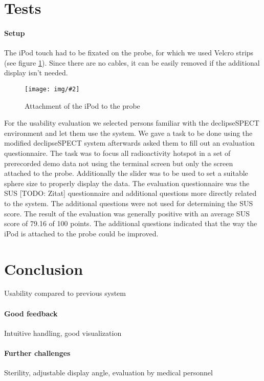 \documentclass{scrartcl}
\newcommand{\graphic}[3][width=\linewidth] %
{
  \begin{figure}[ht]
    \centering
    \texttt{[image: img/\#2]}
    \caption{#3}
    \label{fig:#2}
  \end{figure}
}
\newcommand{\refFigure}[1]{figure \ref{fig:#1}}
\begin{document}
\section{Tests}
\paragraph*{Setup}
The iPod touch had to be fixated on the probe, for which we used Velcro strips (see \refFigure{probe}). Since there are no cables, it can be easily removed if the additional display isn't needed.
\graphic[scale=.5]{probe}{Attachment of the iPod to the probe}

For the usability evaluation we selected persons familiar with the declipseSPECT environment and let them use the system. We gave a task to be done using the modified declipseSPECT system afterwards asked them to fill out an evaluation questionnaire.
The task was to focus all radioactivity hotspot in a set of prerecorded demo data not using the terminal screen but only the screen attached to the probe. Additionally the slider was to be used to set a suitable sphere size to properly display the data. The evaluation questionnaire was the SUS [TODO: Zitat] questionnaire and additional questions more directly related to the system. The additional questions were not used for determining the SUS score.
The result of the evaluation was generally positive with an average SUS score of 79.16 of 100 points. The additional questions indicated that the way the iPod is attached to the probe could be improved.



\section{Conclusion}
Usability compared to previous system
\paragraph*{Good feedback}
Intuitive handling, good visualization
\paragraph*{Further challenges}
Sterility, adjustable display angle, evaluation by medical personnel




\end{document}
